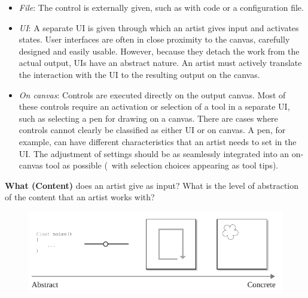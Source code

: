 \begin{itemize}
    \item \textit{File}: The control is externally given, such as with code or a configuration file.
    \item \textit{UI}: A separate UI is given through which an artist gives input and activates states. User interfaces are often in close proximity to the canvas, carefully designed and easily usable. However, because they detach the work from the actual output, UIs have an abstract nature. An artist must actively translate the interaction with the UI to the resulting output on the canvas.
    \item \textit{On canvas}: Controls are executed directly on the output canvas. Most of these controls require an activation or selection of a tool in a separate UI, such as selecting a pen for drawing on a canvas. 
    There are cases where controls cannot clearly be classified as either UI or on canvas. A pen, for example, can have different characteristics that an artist needs to set in the UI. The adjustment of settings should be as seamlessly integrated into an on-canvas tool as possible (\eg~with selection choices appearing as tool tips). 
\end{itemize}








\noindent\textbf{What (Content)} does an artist give as input? What is the level of abstraction of the content that an artist works with?

\begin{figure}[H]
    \centering
        \includegraphics[width=\controlParamsFigWidth\linewidth]{figures/control_paradigms/what.pdf}
\end{figure}

